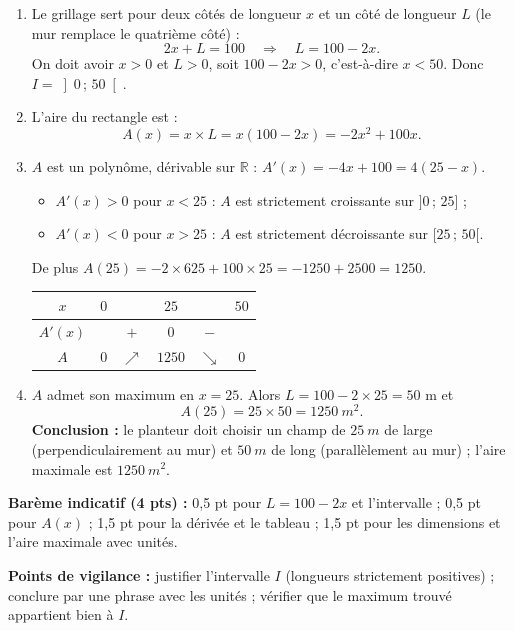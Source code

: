 \documentclass[11pt]{article}
\begin{document}
\begin{corrige}
\begin{enumerate}
    \item Le grillage sert pour deux côtés de longueur $x$ et un côté de longueur $L$ (le mur remplace le quatrième côté) :
    \[
    2x+L=100 \quad\Longrightarrow\quad L=100-2x.
    \]
    On doit avoir $x>0$ et $L>0$, soit $100-2x>0$, c'est-à-dire $x<50$. Donc $I=\left]0\,;\,50\right[$.
    \item L'aire du rectangle est :
    \[
    A(x)=x\times L=x(100-2x)=-2x^2+100x.
    \]
    \item $A$ est un polynôme, dérivable sur $\mathbb{R}$ : $A'(x)=-4x+100=4(25-x)$.
    \begin{itemize}
        \item $A'(x)>0$ pour $x<25$ : $A$ est strictement croissante sur $]0\,;\,25]$ ;
        \item $A'(x)<0$ pour $x>25$ : $A$ est strictement décroissante sur $[25\,;\,50[$.
    \end{itemize}
    De plus $A(25)=-2\times 625+100\times 25=-1250+2500=1250$.
    \begin{center}
    \begin{tabular}{|c|ccccc|}\hline
    $x$ & $0$ & & $25$ & & $50$ \\ \hline
    $A'(x)$ & & $+$ & $0$ & $-$ & \\ \hline
    $A$ & $0$ & $\nearrow$ & $1250$ & $\searrow$ & $0$ \\ \hline
    \end{tabular}
    \end{center}
    \item $A$ admet son maximum en $x=25$. Alors $L=100-2\times 25=50$ m et
    \[
    A(25)=25\times 50=\SI{1250}{m^2}.
    \]
    \textbf{Conclusion :} le planteur doit choisir un champ de $\SI{25}{m}$ de large (perpendiculairement au mur) et $\SI{50}{m}$ de long (parallèlement au mur) ; l'aire maximale est $\SI{1250}{m^2}$.
\end{enumerate}

\textbf{Barème indicatif (4 pts) :} 0,5 pt pour $L=100-2x$ et l'intervalle ; 0,5 pt pour $A(x)$ ; 1,5 pt pour la dérivée et le tableau ; 1,5 pt pour les dimensions et l'aire maximale avec unités.

\textbf{Points de vigilance :} justifier l'intervalle $I$ (longueurs strictement positives) ; conclure par une phrase avec les unités ; vérifier que le maximum trouvé appartient bien à $I$.
\end{corrige}
\end{document}
